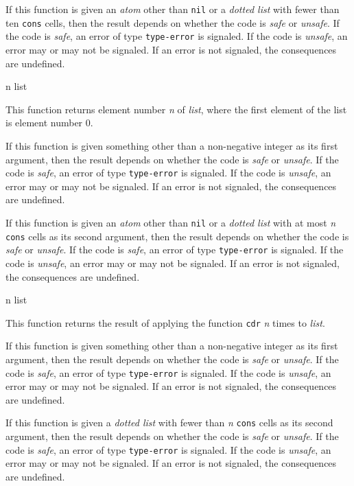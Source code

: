 If this function is given an \emph{atom} other than \texttt{nil} or a
\emph{dotted list} with fewer than ten \texttt{cons} cells, then the
result depends on whether the code is \emph{safe} or \emph{unsafe}.
If the code is \emph{safe}, an error of type \texttt{type-error} is
signaled.  If the code is \emph{unsafe}, an error may or may not be
signaled.  If an error is not signaled, the consequences are
undefined.

 {n list}

This function returns element number \textit{n} of \textit{list},
where the first element of the list is element number $0$.

If this function is given something other than a non-negative integer
as its first argument, then the result depends on whether the code is
\emph{safe} or \emph{unsafe}.  If the code is \emph{safe}, an error of
type \texttt{type-error} is signaled.  If the code is \emph{unsafe},
an error may or may not be signaled.  If an error is not signaled, the
consequences are undefined.

If this function is given an \emph{atom} other than \texttt{nil} or a
\emph{dotted list} with at most \textit{n} \texttt{cons} cells as its
second argument, then the result depends on whether the code is
\emph{safe} or \emph{unsafe}.  If the code is \emph{safe}, an error of
type \texttt{type-error} is signaled.  If the code is \emph{unsafe},
an error may or may not be signaled.  If an error is not signaled, the
consequences are undefined.

 {n list}

This function returns the result of applying the function \texttt{cdr}
\textit{n} times to \textit{list}.

If this function is given something other than a non-negative integer
as its first argument, then the result depends on whether the code is
\emph{safe} or \emph{unsafe}.  If the code is \emph{safe}, an error of
type \texttt{type-error} is signaled.  If the code is \emph{unsafe},
an error may or may not be signaled.  If an error is not signaled, the
consequences are undefined.

If this function is given a \emph{dotted list} with fewer than
\textit{n} \texttt{cons} cells as its second argument, then the result
depends on whether the code is \emph{safe} or \emph{unsafe}.  If the
code is \emph{safe}, an error of type \texttt{type-error} is signaled.
If the code is \emph{unsafe}, an error may or may not be signaled.  If
an error is not signaled, the consequences are undefined.

